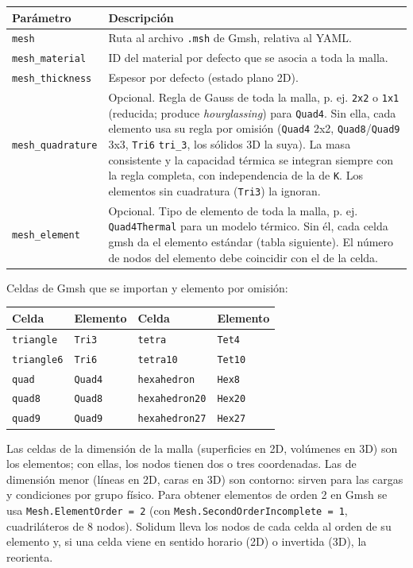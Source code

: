 \documentclass[11pt,oneside]{report}
\begin{document}
\begin{center}
\begin{tabularx}{\textwidth}{YY}
\hline
\textbf{Parámetro} & \textbf{Descripción} \\
\hline
\texttt{mesh} & Ruta al archivo \texttt{.msh} de Gmsh, relativa al YAML. \\
\texttt{mesh\_material} & ID del material por defecto que se asocia a toda la malla. \\
\texttt{mesh\_thickness} & Espesor por defecto (estado plano 2D). \\
\texttt{mesh\_quadrature} & Opcional. Regla de Gauss de toda la malla, p. ej. \texttt{\textquotedbl{}2x2\textquotedbl{}} o \texttt{\textquotedbl{}1x1\textquotedbl{}} (reducida; produce \textit{hourglassing}) para \texttt{Quad4}. Sin ella, cada elemento usa su regla por omisión (\texttt{Quad4} 2x2, \texttt{Quad8}/\texttt{Quad9} 3x3, \texttt{Tri6} \texttt{tri\_3}, los sólidos 3D la suya). La masa consistente y la capacidad térmica se integran siempre con la regla completa, con independencia de la de \texttt{K}. Los elementos sin cuadratura (\texttt{Tri3}) la ignoran. \\
\texttt{mesh\_element} & Opcional. Tipo de elemento de toda la malla, p. ej. \texttt{Quad4Thermal} para un modelo térmico. Sin él, cada celda gmsh da el elemento estándar (tabla siguiente). El número de nodos del elemento debe coincidir con el de la celda. \\
\hline
\end{tabularx}
\end{center}
Celdas de Gmsh que se importan y elemento por omisión:

\begin{center}
\begin{tabularx}{\textwidth}{YYYY}
\hline
\textbf{Celda} & \textbf{Elemento} & \textbf{Celda} & \textbf{Elemento} \\
\hline
\texttt{triangle} & \texttt{Tri3} & \texttt{tetra} & \texttt{Tet4} \\
\texttt{triangle6} & \texttt{Tri6} & \texttt{tetra10} & \texttt{Tet10} \\
\texttt{quad} & \texttt{Quad4} & \texttt{hexahedron} & \texttt{Hex8} \\
\texttt{quad8} & \texttt{Quad8} & \texttt{hexahedron20} & \texttt{Hex20} \\
\texttt{quad9} & \texttt{Quad9} & \texttt{hexahedron27} & \texttt{Hex27} \\
\hline
\end{tabularx}
\end{center}
Las celdas de la dimensión de la malla (superficies en 2D, volúmenes en 3D) son los elementos; con ellas, los nodos tienen dos o tres coordenadas. Las de dimensión menor (líneas en 2D, caras en 3D) son contorno: sirven para las cargas y condiciones por grupo físico. Para obtener elementos de orden 2 en Gmsh se usa \texttt{Mesh.\allowbreak{}ElementOrder = 2} (con \texttt{Mesh.\allowbreak{}SecondOrderIncomplete = 1}, cuadriláteros de 8 nodos). Solidum lleva los nodos de cada celda al orden de su elemento y, si una celda viene en sentido horario (2D) o invertida (3D), la reorienta.
\end{document}
